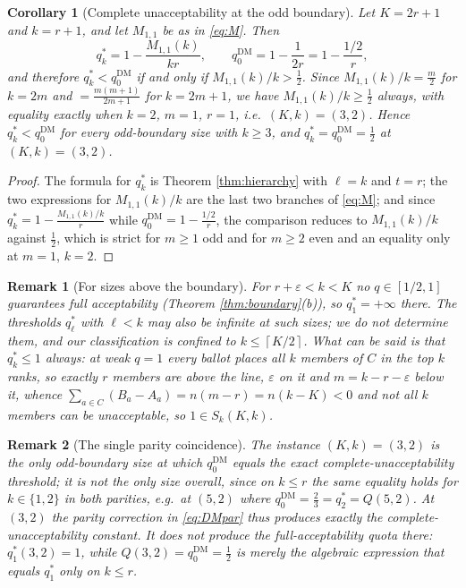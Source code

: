 \documentclass[11pt]{article}
\theoremstyle{plain}
\newtheorem{corollary}{Corollary}
\newtheorem{remark}{Remark}
\theoremstyle{definition}
\newcommand{\cl}[1]{\left\lceil #1\right\rceil}
\newcommand{\eps}{\varepsilon}
\newcommand{\DM}{\mathrm{DM}}
\begin{document}
\begin{corollary}[Complete unacceptability at the odd boundary]
\label{cor:boundary}
Let $K=2r+1$ and $k=r+1$, and let $M_{1,1}$ be as in \eqref{eq:M}. Then
\[
q_k^*=1-\frac{M_{1,1}(k)}{kr},
\qquad
q_0^{\DM}=1-\frac{1}{2r}=1-\frac{1/2}{r},
\]
and therefore $q_k^*<q_0^{\DM}$ if and only if $M_{1,1}(k)/k>\frac12$. Since $M_{1,1}(k)/k=\frac{m}{2}$ for $k=2m$ and $=\frac{m(m+1)}{2m+1}$ for $k=2m+1$, we have $M_{1,1}(k)/k\ge\frac12$ always, with equality exactly when $k=2$, $m=1$, $r=1$, i.e.\ $(K,k)=(3,2)$. Hence $q_k^*<q_0^{\DM}$ for every odd-boundary size with $k\ge3$, and $q_k^*=q_0^{\DM}=\frac12$ at $(K,k)=(3,2)$.
\end{corollary}

\begin{proof}
The formula for $q_k^*$ is Theorem \ref{thm:hierarchy} with $\ell=k$ and $t=r$; the two expressions for $M_{1,1}(k)/k$ are the last two branches of \eqref{eq:M}; and since $q_k^*=1-\frac{M_{1,1}(k)/k}{r}$ while $q_0^{\DM}=1-\frac{1/2}{r}$, the comparison reduces to $M_{1,1}(k)/k$ against $\frac12$, which is strict for $m\ge1$ odd and for $m\ge2$ even and an equality only at $m=1$, $k=2$.
\end{proof}

\begin{remark}[For sizes above the boundary]
\label{rem:aboveboundary}
For $r+\eps<k<K$ no $q\in[1/2,1]$ guarantees full acceptability (Theorem \ref{thm:boundary}(b)), so $q_1^*=+\infty$ there. The thresholds $q_\ell^*$ with $\ell<k$ may also be infinite at such sizes; we do not determine them, and our classification is confined to $k\le\cl{K/2}$. What can be said is that $q_k^*\le1$ always: at weak $q=1$ every ballot places all $k$ members of $C$ in the top $k$ ranks, so exactly $r$ members are above the line, $\eps$ on it and $m=k-r-\eps$ below it, whence $\sum_{a\in C}(B_a-A_a)=n(m-r)=n(k-K)<0$ and not all $k$ members can be unacceptable, so $1\in S_k(K,k)$.
\end{remark}

\begin{remark}[The single parity coincidence]
\label{rem:paritycoincidence}
The instance $(K,k)=(3,2)$ is the only \emph{odd-boundary} size at which $q_0^{\DM}$ equals the exact complete-unacceptability threshold; it is not the only size overall, since on $k\le r$ the same equality holds for $k\in\{1,2\}$ in both parities, e.g.\ at $(5,2)$ where $q_0^{\DM}=\frac23=q_2^*=Q(5,2)$. At $(3,2)$ the parity correction in \eqref{eq:DMpar} thus produces exactly the complete-unacceptability constant. It does \emph{not} produce the full-acceptability quota there: $q_1^*(3,2)=1$, while $Q(3,2)=q_0^{\DM}=\frac12$ is merely the algebraic expression that equals $q_1^*$ only on $k\le r$.
\end{remark}
\end{document}
